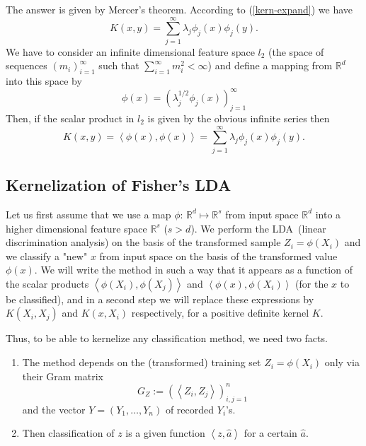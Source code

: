 \documentclass[11pt,twoside]{article}%
\theoremstyle{change}
\begin{document}
The answer is given by Mercer's theorem. According to (\ref{kern-expand}) we
have
\[
K(x,y)=\sum_{j=1}^{\infty}\lambda_{j}\phi_{j}(x)\phi_{j}(y).
\]
We have to consider an infinite dimensional feature space $l_{2}$ (the space
of sequences $\left(  m_{i}\right)  _{i=1}^{\infty}$ such that $\sum
_{i=1}^{\infty}m_{i}^{2}<\infty$) and define a mapping from $\mathbb{R}^{d}$
into this space by
\[
\phi(x)=\left(  \lambda_{j}^{1/2}\phi_{j}(x)\right)  _{j=1}^{\infty}%
\]
Then, if the scalar product in $l_{2}$ is given by the obvious infinite series
then
\[
K(x,y)=\left\langle \phi(x),\phi(x)\right\rangle =\sum_{j=1}^{\infty}%
\lambda_{j}\phi_{j}(x)\phi_{j}(y).
\]


\subsection{Kernelization of Fisher's LDA}

Let us first assume that we use a map $\phi$: $\mathbb{R}^{d}\longmapsto
\mathbb{R}^{s}$ from input space $\mathbb{R}^{d}$ into a higher dimensional
feature space $\mathbb{R}^{s}$ ($s>d$). We perform the LDA\ (linear
discrimination analysis) on the basis of the transformed sample $Z_{i}%
=\phi\left(  X_{i}\right)  $ and we classify a "new" $x$ from input space on
the basis of the transformed value $\phi\left(  x\right)  $. We will write the
method in such a way that it appears as a function of the scalar products
$\left\langle \phi\left(  X_{i}\right)  ,\phi\left(  X_{j}\right)
\right\rangle $ and $\left\langle \phi\left(  x\right)  ,\phi\left(
X_{i}\right)  \right\rangle $ (for the $x$ to be classified), and in a second
step we will replace these expressions by $K(X_{i},X_{j})$ and $K(x,X_{i})$
respectively, for a positive definite kernel $K$.

Thus, to be able to kernelize any classification method, we need two facts.

\begin{enumerate}
\item The method depends on the (transformed) training set $Z_{i}=\phi\left(
X_{i}\right)  $ only via their Gram matrix
\[
G_{Z}:=\left(  \left\langle Z_{i},Z_{j}\right\rangle \right)  _{i,j=1}^{n}%
\]
and the vector $Y=\left(  Y_{1},\ldots,Y_{n}\right)  $ of recorded $Y_{i}$'s.

\item Then classification of $z$ is a given function $\left\langle z,\hat
{a}\right\rangle $ for a certain $\hat{a}$.
\end{enumerate}
\end{document}
